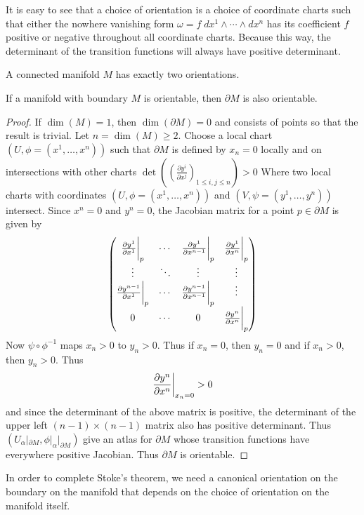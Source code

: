 \documentclass[a4paper]{article}
\begin{document}
It is easy to see that a choice of orientation is a choice of coordinate charts such that either the nowhere vanishing form $\omega=f\;dx^1\wedge\cdots\wedge dx^n$ has its coefficient $f$ positive or negative throughout all coordinate charts. Because this way, the determinant of the transition functions will always have positive determinant. 

\begin{prp}{}{} A connected manifold $M$ has exactly two orientations. 
\end{prp}

\begin{prp}{}{} If a manifold with boundary $M$ is orientable, then $\partial M$ is also orientable. \tcbline
\begin{proof}
If $\dim(M)=1$, then $\dim(\partial M)=0$ and consists of points so that the result is trivial. Let $n=\dim(M)\geq 2$. Choose a local chart $(U,\phi=(x^1,\dots,x^n))$ such that $\partial M$ is defined by $x_n=0$ locally and on intersections with other charts $\det\left(\left(\frac{\partial y^i}{\partial x^j}\right)_{1\leq i,j\leq n}\right)>0$ Where two local charts with coordinates $(U,\phi=(x^1,\dots,x^n))$ and $(V,\psi=(y^1,\dots,y^n))$ intersect. Since $x^n=0$ and $y^n=0$, the Jacobian matrix for a point $p\in\partial M$ is given by $$\begin{pmatrix}
\frac{\partial y^1}{\partial x^1}\bigg{|}_p & \cdots & \frac{\partial y^1}{\partial x^{n-1}}\bigg{|}_p & \frac{\partial y^1}{\partial x^n}\bigg{|}_p\\
\vdots & \ddots & \vdots & \vdots\\
\frac{\partial y^{n-1}}{\partial x^1}\bigg{|}_p & \cdots & \frac{\partial y^{n-1}}{\partial x^{n-1}}\bigg{|}_p & \vdots\\
0 & \cdots & 0 & \frac{\partial y^n}{\partial x^n}\bigg{|}_p
\end{pmatrix}$$
Now $\psi\circ\phi^{-1}$ maps $x_n>0$ to $y_n>0$. Thus if $x_n=0$, then $y_n=0$ and if $x_n>0$, then $y_n>0$. Thus $$\frac{\partial y^n}{\partial x^n}\bigg{|}_{x_n=0}>0$$ and since the determinant of the above matrix is positive, the determinant of the upper left $(n-1)\times(n-1)$ matrix also has positive determinant. Thus $(U_\alpha|_{\partial M},\phi|_{\alpha}|_{\partial M})$ give an atlas for $\partial M$ whose transition functions have everywhere positive Jacobian. Thus $\partial M$ is orientable. 
\end{proof}
\end{prp}

In order to complete Stoke's theorem, we need a canonical orientation on the boundary on the manifold that depends on the choice of orientation on the manifold itself. 
\end{document}
